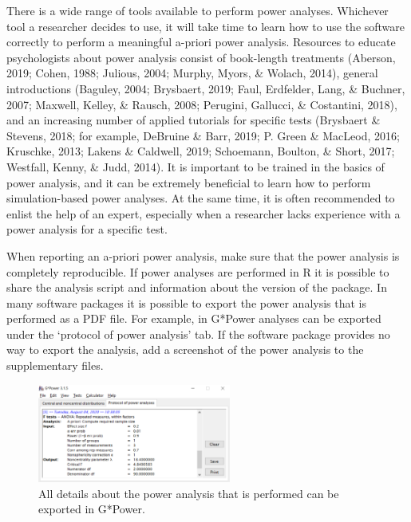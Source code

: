 \documentclass[
  english,
  ,jou, a4paper,floatsintext]{apa6}
\begin{document}
There is a wide range of tools available to perform power analyses. Whichever tool a researcher decides to use, it will take time to learn how to use the software correctly to perform a meaningful a-priori power analysis. Resources to educate psychologists about power analysis consist of book-length treatments (Aberson, 2019; Cohen, 1988; Julious, 2004; Murphy, Myors, \& Wolach, 2014), general introductions (Baguley, 2004; Brysbaert, 2019; Faul, Erdfelder, Lang, \& Buchner, 2007; Maxwell, Kelley, \& Rausch, 2008; Perugini, Gallucci, \& Costantini, 2018), and an increasing number of applied tutorials for specific tests (Brysbaert \& Stevens, 2018; for example, DeBruine \& Barr, 2019; P. Green \& MacLeod, 2016; Kruschke, 2013; Lakens \& Caldwell, 2019; Schoemann, Boulton, \& Short, 2017; Westfall, Kenny, \& Judd, 2014). It is important to be trained in the basics of power analysis, and it can be extremely beneficial to learn how to perform simulation-based power analyses. At the same time, it is often recommended to enlist the help of an expert, especially when a researcher lacks experience with a power analysis for a specific test.

When reporting an a-priori power analysis, make sure that the power analysis is completely reproducible. If power analyses are performed in R it is possible to share the analysis script and information about the version of the package. In many software packages it is possible to export the power analysis that is performed as a PDF file. For example, in G*Power analyses can be exported under the `protocol of power analysis' tab. If the software package provides no way to export the analysis, add a screenshot of the power analysis to the supplementary files.

\begin{figure}
\includegraphics[width=240px]{images/gpowprotocol} \caption{All details about the power analysis that is performed can be exported in G*Power.}\label{fig:gpowprotocol}
\end{figure}
\end{document}
